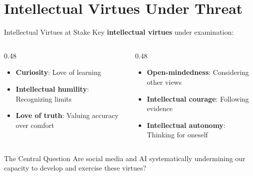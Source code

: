 ﻿\documentclass[aspectratio=169,11pt]{beamer}
\begin{document}
\section{Intellectual Virtues Under Threat}


\begin{frame}{Intellectual Virtues at Stake}
Key \textbf{intellectual virtues} under examination:

\begin{columns}[T]
\begin{column}{0.48\textwidth}
\begin{itemize}
    \item \textbf{Curiosity}: Love of learning
    \item \textbf{Intellectual humility}: Recognizing limits
    \item \textbf{Love of truth}: Valuing accuracy over comfort
\end{itemize}
\end{column}
\begin{column}{0.48\textwidth}
\begin{itemize}
    \item \textbf{Open-mindedness}: Considering other views
    \item \textbf{Intellectual courage}: Following evidence
    \item \textbf{Intellectual autonomy}: Thinking for oneself
\end{itemize}
\end{column}
\end{columns}

\vspace{0.5cm}
\begin{alertblock}{The Central Question}
Are social media and AI systematically undermining our capacity to develop and exercise these virtues?
\end{alertblock}
\end{frame}
\end{document}
